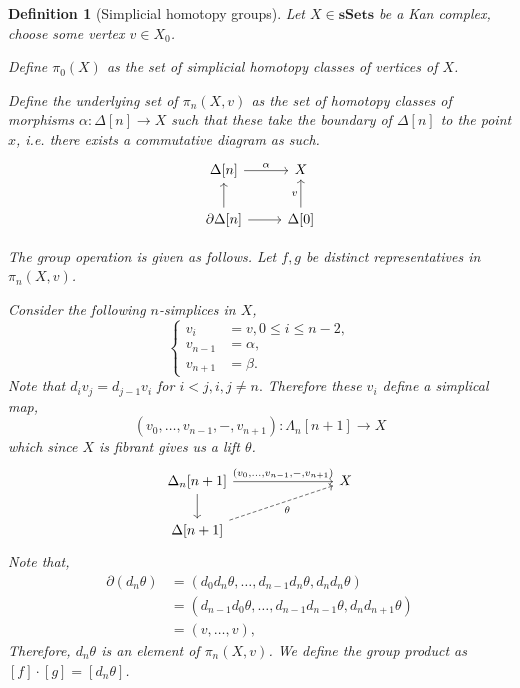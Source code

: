 \documentclass[12pt]{report}
\numberwithin{equation}{section}
\newtheorem{definition}[dummy]{Definition}
\begin{document}
	\begin{definition}[Simplicial homotopy groups]
		Let \( X \in \mathbf{sSets} \) be a Kan complex, choose some vertex \( v \in X_0 \).
		
		Define \( \pi_0(X)  \) as the set of simplicial homotopy classes of vertices of \( X \).
		
		Define the underlying set of \(\pi_n(X,v) \) as the set of homotopy classes of morphisms \( \alpha: \Delta[n] \to X \) such that these take the boundary of \( \Delta[n] \) to the point \( x \), i.e. there exists a commutative diagram as such.
		\[\begin{tikzcd}
			{\Delta[n]} & X \\
			{\partial \Delta[n]} & {\Delta[0]}
			\arrow["\alpha", from=1-1, to=1-2]
			\arrow[from=2-1, to=1-1]
			\arrow[from=2-1, to=2-2]
			\arrow["v",from=2-2, to=1-2]
		\end{tikzcd}\]
		
		The group operation is given as follows. Let \( f, g \) be distinct representatives in \( \pi_n(X,v) \).
 		 
		Consider the following \( n \)-simplices in \( X \),
		\[ \begin{cases}
			v_i &= v, 0 \leq i \leq n-2,\\
			v_{n-1} &= \alpha,\\
			v_{n+1} &= \beta.
		\end{cases} \]
		Note that \( d_i v_j=d_{j-1}v_i \) for \( i<j, i,j \neq n. \) Therefore these \( v_i \) define a simplical map, \[ (v_0,\dots,v_{n-1},-,v_{n+1}): \Lambda_n[n+1] \to X \] which since \( X \) is fibrant gives us a lift \( \theta \).
		\[\begin{tikzcd}
			{\Delta_n[n+1]} &&& X \\
			{\Delta[n+1]}
			\arrow["{ (v_0,\dots,v_{n-1},-,v_{n+1})}", from=1-1, to=1-4]
			\arrow[from=1-1, to=2-1]
			\arrow["\theta"', dashed, from=2-1, to=1-4]
		\end{tikzcd}\]
		Note that,
		\begin{align*}
			\partial(d_n\theta) &= (d_0d_n\theta, \dots, d_{n-1}d_n\theta, d_nd_n\theta) \\
			&= (d_{n-1}d_0\theta, \dots, d_{n-1}d_{n-1}\theta, d_nd_{n+1}\theta) \\
			&= (v, \dots, v),
		\end{align*}
		Therefore, \( d_n\theta \) is an element of \( \pi_n(X,v) \).
		We define the group product as \( [f]\cdot [g]=[d_n\theta] \).
		
	\end{definition}
	
\end{document}
